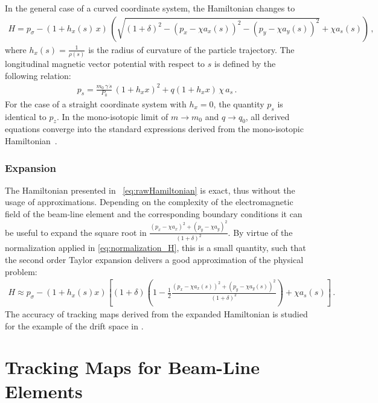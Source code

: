 %
In the general case of a curved coordinate system, the Hamiltonian changes to~\cite{Fjellstrom:1642385}
%
\begin{align}
H = p_\sigma - (1+h_x(s)\,x) \, \left(  \sqrt{ (1+\delta)^2  - (p_x - \chi a_x(s))^2 - (p_y-\chi a_y(s))^2} + \chi a_s(s)  \right) \, , \label{eq:rawHamiltonian}
\end{align}
%
where $h_x(s) = \frac{1}{\rho(s)}$ is the radius of curvature of the particle trajectory. The longitudinal magnetic vector potential with respect to $s$ is defined by the following relation:
%
\begin{align}
p_s = \frac{m_0 \, \gamma \, \dot{s}}{P_0} \, (1+h_xx)^2 + q (1+h_xx) \, \chi \, a_s \, .
\end{align}
%
For the case of a straight coordinate system with $h_x=0$, the quantity $p_s$ is identical to $p_z$. In the mono-isotopic limit of $m \rightarrow m_0$ and $q \rightarrow q_0$, all derived equations converge into the standard expressions derived from the mono-isotopic Hamiltonian~\cite{CERN-SL-95-12}.

\subsubsection{Expansion}


The Hamiltonian presented in ~\eqref{eq:rawHamiltonian} is exact, thus without the usage of approximations. Depending on the complexity of the electromagnetic field of the beam-line element and the corresponding boundary conditions it can be useful to expand the square root in $\frac{(p_x-\chi a_x)^2 + (p_y - \chi a_y)^2}{(1+\delta)^2}$. By virtue of the normalization applied in \eqref{eq:normalization_H}, this is a small quantity, such that the second order Taylor expansion delivers a good approximation of the physical problem:
\begin{align}
H \approx p_\sigma - (1+h_x(s)x) \left[ (1+\delta) \left( 1 - \frac{1}{2} \frac{(p_x - \chi a_x(s))^2 + (p_y - \chi a_y(s))^2 }{(1+\delta)^2} \right) + \chi a_s(s) \right] \, . \label{eq:expanded_hamiltonian}
\end{align}  
The accuracy of tracking maps derived from the expanded Hamiltonian is studied for the example of the drift space in \cite{Fjellstrom:1642385}.


\section{Tracking Maps for Beam-Line Elements}\label{chap:trackingmaps}

